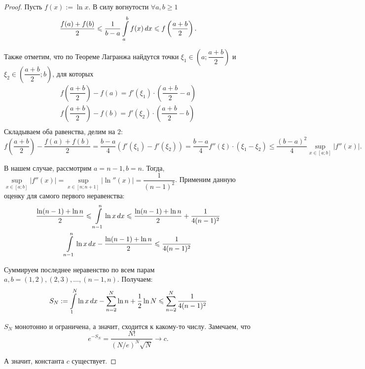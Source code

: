 \documentclass[a4paper]{article}
\theoremstyle{named}
\renewcommand{\int}{\intop}
\begin{document}
   		\begin{proof}
   			Пусть $f(x) := \ln x$. В силу вогнутости $\forall a, b \geq 1$
   			\begin{equation*}
   				\dfrac{f(a) + f(b)}{2} \leq \dfrac{1}{b - a} \int_a^b f(x) \dd x \leq f\left(\dfrac{a + b}{2}\right).
   			\end{equation*}

   			Также отметим, что по Теореме Лагранжа найдутся точки $\xi_1 \in \left(a; \dfrac{a + b}{2}\right)$ и $\xi_2 \in \left(\dfrac{a + b}{2}; b\right)$, для которых
   			\[\begin{gathered}
   				f \left(\dfrac{a + b}{2}\right) - f(a) = f'(\xi_1) \cdot \left(\dfrac{a + b}{2} - a\right) \\
   				f \left(\dfrac{a + b}{2}\right) - f(b) = f'(\xi_2) \cdot \left(\dfrac{a + b}{2} - b\right) \\
   			\end{gathered}\]
   			Складываем оба равенства, делим на $2$:
   			\begin{equation*}
   				f \left(\dfrac{a + b}{2}\right) - \dfrac{f(a) + f(b)}{2} = \dfrac{b - a}{4} (f'(\xi_1) - f'(\xi_2)) = \dfrac{b - a}{4} f''(\xi) \cdot (\xi_1 - \xi_2) \leq \dfrac{(b - a)^2}{4} \sup\limits_{x \in [a; b]} |f''(x)|.
   			\end{equation*}

   			В нашем случае, рассмотрим $a = n - 1, b = n$. Тогда, $\sup\limits_{x \in [a; b]} |f''(x)| = \sup\limits_{x \in [n; n + 1]} |\ln''(x)| = \dfrac{1}{(n - 1)^2}$. Применим данную оценку для самого первого неравенства:
   			\[\begin{gathered}
                \dfrac{\ln(n - 1) + \ln n}{2} \leq \int_{n - 1}^n \ln x \dd x \leq \dfrac{\ln(n - 1) + \ln n}{2} + \dfrac{1}{4(n - 1)^2} \\
                \int_{n - 1}^n \ln x \dd x - \dfrac{\ln(n - 1) + \ln n}{2} \leq \dfrac{1}{4(n - 1)^2}
            \end{gathered}\]

            Суммируем последнее неравенство по всем парам $a, b = (1, 2), (2, 3), \dots, (n - 1, n)$. Получаем:
            \begin{equation*}
                S_N := \int_1^N \ln x \dd x - \sum_{n = 2}^N \ln n + \dfrac{1}{2} \ln N \leq \sum_{n = 2}^N \dfrac{1}{4(n - 1)^2}
            \end{equation*}

            $S_N$ монотонно и ограничена, а значит, сходится к какому-то числу. Замечаем, что
            \begin{equation*}
                e^{-S_N} = \dfrac{N!}{(N / e)^N \sqrt{N}} \to c.
            \end{equation*}

            А значит, константа $c$ существует.
   		\end{proof}
\end{document}
